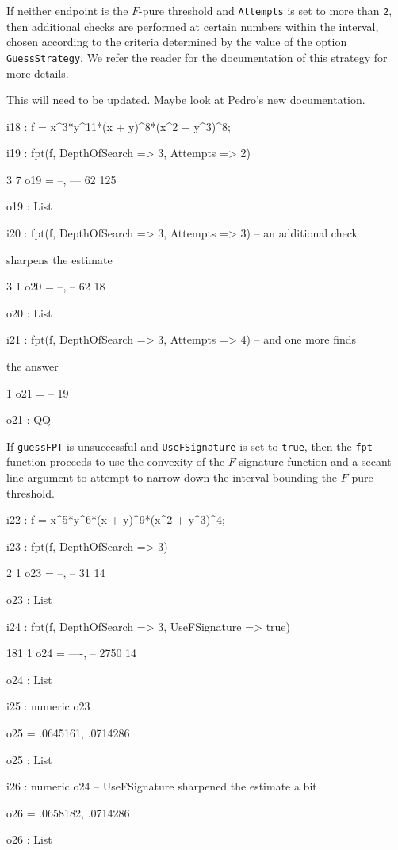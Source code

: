 \documentclass{amsart}
\begin{document}
If neither endpoint is the $F$-pure threshold and {\tt Attempts} is set to more than {\tt 2}, then  additional checks are performed at certain numbers within the interval, chosen according to the criteria determined by the value of the option {\tt GuessStrategy}.  We refer the reader for the documentation of this strategy for more details.

{\color{red}  This will need to be updated.  Maybe look at Pedro's new documentation.}

{\small
{}
\begin{MyVerbatim}

i18 : f = x^3*y^11*(x + y)^8*(x^2 + y^3)^8;

i19 : fpt(f, DepthOfSearch => 3, Attempts => 2)

        3   7
o19 = {--, ---}
       62  125

o19 : List

i20 : fpt(f, DepthOfSearch => 3, Attempts => 3) -- an additional check

      sharpens the estimate

        3   1
o20 = {--, --}
       62  18

o20 : List

i21 : fpt(f, DepthOfSearch => 3, Attempts => 4) -- and one more finds

      the answer

       1
o21 = --
      19

o21 : QQ
\end{MyVerbatim}
}
\medspace

If {\tt guessFPT} is unsuccessful and {\tt UseFSignature} is set to {\tt true}, then the {\tt fpt} function proceeds to use the convexity of the $F$-signature function and a secant line argument to attempt to narrow down the interval bounding the $F$-pure threshold.

{\small
{}
\begin{MyVerbatim}

i22 : f = x^5*y^6*(x + y)^9*(x^2 + y^3)^4;

i23 : fpt(f, DepthOfSearch => 3)

        2   1
o23 = {--, --}
       31  14

o23 : List

i24 : fpt(f, DepthOfSearch => 3, UseFSignature => true)

        181   1
o24 = {----, --}
       2750  14

o24 : List

i25 : numeric o23

o25 = {.0645161, .0714286}

o25 : List

i26 : numeric o24 -- UseFSignature sharpened the estimate a bit

o26 = {.0658182, .0714286}

o26 : List
\end{MyVerbatim}
}
\medspace
\end{document}
